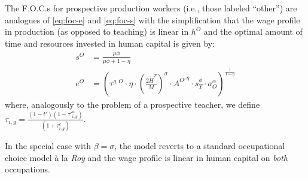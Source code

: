 \documentclass[onehalfspacing,11pt]{article}
\begin{document}
The F.O.C.s for prospective production workers (i.e., those labeled ``other'') are analogues of \eqref{eq:foc-e} and \eqref{eq:foc-s} with the simplification that the wage profile in production (as opposed to teaching) is linear in $h^O$ and the optimal amount of time and resources invested in human capital is given by:
\begin{align}
s^{O} & = \frac{\mu \phi}{\mu \phi+1-\eta} \\
\label{eq:e_O}
e^{O} & = \left( \tau^{g,O} \cdot \eta \cdot \left(\tfrac{2\widetilde{H}^T}{M}\right)^\sigma\cdot {A^{O'}}^\eta \cdot s_T^\phi \cdot a_O^\alpha \right)^{\frac{1}{1-\eta}}
\end{align}
where, analogously to the problem of a prospective teacher, we define $\tau_{i,g} =\frac{(1-t')(1-{\tau'}_{i,g}^w)}{(1+\tau_{i,g}^e)}$.

In the special case with $\beta=\sigma$, the model reverts to a standard occupational choice model \`a la {\it Roy} and the wage profile is linear in human capital on {\it both} occupations.
\end{document}
